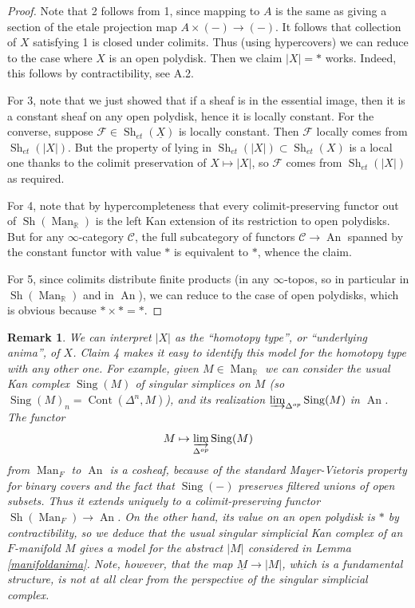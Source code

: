 \documentclass[12pt]{article}
\newtheorem{remark}[theorem]{Remark}
\newcommand{\on}{\operatorname}
\newcommand{\mbb}{\mathbb}
\begin{document}
\begin{proof}
Note that 2 follows from 1, since mapping to $A$ is the same as giving a section of the etale projection map $A\times (-)\rightarrow (-)$.  It follows that collection of $X$ satisfying 1 is closed under colimits.  Thus (using hypercovers) we can reduce to the case where $X$ is an open polydisk.  Then we claim $|X|=\ast$ works.  Indeed, this follows by contractibility, see \cite{LurieHA} A.2.

For 3, note that we just showed that if a sheaf is in the essential image, then it is a constant sheaf on any open polydisk, hence it is locally constant. For the converse, suppose $\mathcal{F}\in\on{Sh}_{et}(\underline{X})$ is locally constant.  Then $\mathcal{F}$ locally comes from $\on{Sh}_{et}(|X|)$.  But the property of lying in $\on{Sh}_{et}(|X|)\subset\on{Sh}_{et}(X)$ is a local one thanks to the colimit preservation of $X\mapsto |X|$, so $\mathcal{F}$ comes from $\on{Sh}_{et}(|X|)$ as required.

For 4, note that by hypercompleteness that every colimit-preserving functor out of $\on{Sh}(\on{Man}_{\mbb{R}})$ is the left Kan extension of its restriction to open polydisks.  But for any $\infty$-category $\mathcal{C}$, the full subcategory of functors $\mathcal{C}\to \on{An}$ spanned by the constant functor with value $\ast$ is equivalent to $\ast$, whence the claim.

For 5, since colimits distribute finite products (in any $\infty$-topos, so in particular in $\on{Sh}(\on{Man}_{\mbb{R}})$ and in $\on{An}$), we can reduce to the case of open polydisks, which is obvious because $\ast\times \ast=\ast$.
\end{proof}

\begin{remark}
We can interpret $|X|$ as the ``homotopy type'', or ``underlying anima'', of $X$.  Claim 4 makes it easy to identify this model for the homotopy type with any other one.  For example, given $M\in\on{Man}_{\mbb{R}}$ we can consider the usual Kan complex $\on{Sing}(M)$ of singular simplices on $M$ (so $\on{Sing}(M)_n = \on{Cont}(\Delta^n,M)$), and its realization $\varinjlim_{\Delta^{op}} \on{Sing}(M)$ in $\on{An}$.  The functor
$$M\mapsto \varinjlim_{\Delta^{op}} \on{Sing}(M)$$
from $\on{Man}_F$ to $\on{An}$ is a cosheaf, because of the standard Mayer-Vietoris property for binary covers and the fact that $\on{Sing}(-)$ preserves filtered unions of open subsets.  Thus it extends uniquely to a colimit-preserving functor $\on{Sh}(\on{Man}_F)\rightarrow\on{An}$.  On the other hand, its value on an open polydisk is $\ast$ by contractibility, so we deduce that the usual singular simplicial Kan complex of an $F$-manifold $M$ gives a model for the abstract $|M|$ considered in Lemma \ref{manifoldanima}.  Note, however, that the map $\underline{M}\rightarrow |M|$, which is a fundamental structure, is not at all clear from the perspective of the singular simplicial complex.
\end{remark}
\end{document}
